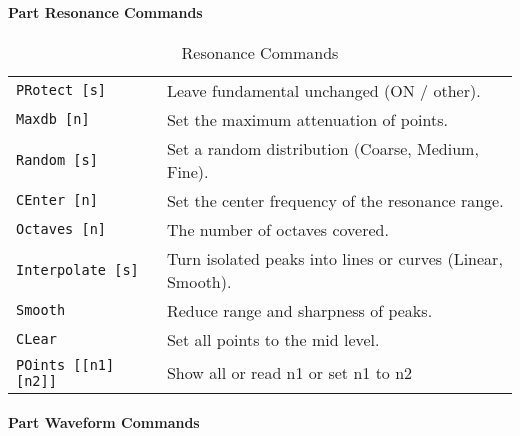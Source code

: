 \begin{table}[H]
\begin{tabular}{l l}
      \end{tabular}
   \end{table}

\paragraph{Part Resonance Commands}
\label{paragraph:command_line_part_resonance_commands}

   \begin{table}[H]
      \centering
      \caption{Resonance Commands}
      \label{table:part_resonance_commands}
      \begin{tabular}{l l}

   \texttt{PRotect [s]} &
      Leave fundamental unchanged (ON / other). \\
   \texttt{Maxdb [n]} &
      Set the maximum attenuation of points. \\
   \texttt{Random [s]} &
      Set a random distribution (Coarse, Medium, Fine). \\
   \texttt{CEnter [n]} &
      Set the center frequency of the resonance range. \\
   \texttt{Octaves [n]} &
      The number of octaves covered. \\
   \texttt{Interpolate [s]} &
      Turn isolated peaks into lines or curves (Linear, Smooth). \\
   \texttt{Smooth} &
      Reduce range and sharpness of peaks. \\
   \texttt{CLear} &
      Set all points to the mid level. \\
   \texttt{POints [[n1] [n2]]} &
      Show all or read n1 or set n1 to n2 \\

      \end{tabular}
   \end{table}

\paragraph{Part Waveform Commands}
\label{paragraph:command_line_part_waveform_commands}

